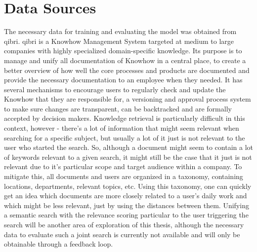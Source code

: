 \documentclass[draft,final]{vutinfth} %
\begin{document}
\section{Data Sources}
The necessary data for training and evaluating the model was obtained from qibri.
qibri is a Knowhow Management System targeted at medium to large companies with highly specialized domain-specific knowledge. Its purpose is to manage and unify all documentation of Knowhow in a central place, to create a better overview of how well the core processes and products are documented and provide the necessary documentation to an employee when they needed. It has several mechanisms to encourage users to regularly check and update the Knowhow that they are responsible for, a versioning and approval process system to make sure changes are transparent, can be backtracked and are formally accepted by decision makers. Knowledge retrieval is particularly difficult in this context, however - there's a lot of information that might seem relevant when searching for a specific subject, but usually a lot of it just is not relevant to the user who started the search. So, although a document might seem to contain a lot of keywords relevant to a given search, it might still be the case that it just is not relevant due to it's particular scope and target audience within a company. To mitigate this, all documents and users are organized in a taxonomy, containing locations, departments, relevant topics, etc. Using this taxonomy, one can quickly get an idea which documents are more closely related to a user's daily work and which might be less relevant, just by using the distances between them. Unifying a semantic search with the relevance scoring particular to the user triggering the search will be another area of exploration of this thesis, although the necessary data to evaluate such a joint search is currently not available and will only be obtainable through a feedback loop.
\end{document}
